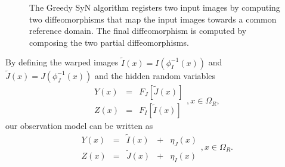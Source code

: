 \begin{figure}[H]
\centering
{}
\caption{The Greedy SyN algorithm registers two input images by computing two diffeomorphisms that map the input images towards a common reference domain. The final
diffeomorphism is computed by composing the two partial diffeomorphisms.}
\label{fig:syn_overview}
\end{figure}

By defining the warped images \hbox{$\tilde{I}(x) = I(\phi_{I}^{-1}(x))$} and \hbox{$\tilde{J}(x) = J(\phi_{J}^{-1}(x))$} and the hidden random variables
\begin{equation}\label{eq:hidden_fields}
    \begin{array}{ccc}
        Y(x) &=& F_{J}\left[\tilde{J}(x)\right]\\
        Z(x) &=& F_{I}\left[\tilde{I}(x)\right]
    \end{array},x\in\Omega_{R},
\end{equation}
our observation model can be written as
\begin{equation}\label{eq:SyNEM_gom_update}
    \begin{array}{ccccc}
    	Y(x) &=& \tilde{I}(x) &+& \eta_{J}(x)\\
        Z(x) &=& \tilde{J}(x) &+& \eta_{I}(x)
    \end{array}, x\in\Omega_{R}.
\end{equation}

